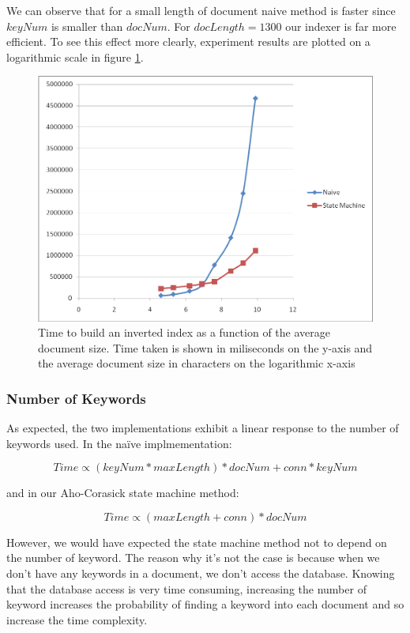 \documentclass[10pt]{report}
\begin{document}
We can observe that for a small length of document naive method is
faster since \(keyNum\) is smaller than \(docNum\). For \(docLength = 1300\)
our indexer is far more efficient. To see this effect more clearly,
experiment results are plotted on a logarithmic scale in figure
\ref{fig:naivedocumentsizelog}.

\begin{figure}
  \begin{center}
    \includegraphics[width=\textwidth,height=!]{naivedocumentsizelog}
  \end{center}
  \caption{Time to build an inverted index as a function of the
      average document size. Time taken is shown in miliseconds on the
      y-axis and the average document size in characters on the
      logarithmic x-axis}
  \label{fig:naivedocumentsizelog}
\end{figure} 


\subsubsection{Number of Keywords}
As expected, the two implementations exhibit a linear response to the
number of keywords used. In the na\"{i}ve implmementation:

\[Time \propto (keyNum * maxLength) * docNum + conn * keyNum\]

and in our Aho-Corasick state machine method: 

\[Time \propto (maxLength + conn) * docNum \]

However, we would have expected the state machine method not to depend
on the number of keyword. The reason why it’s not the case is because
when we don’t have any keywords in a document, we don’t access the
database. Knowing that the database access is very time consuming,
increasing the number of keyword increases the probability of finding a
keyword into each document and so increase the time complexity.  
\end{document}
